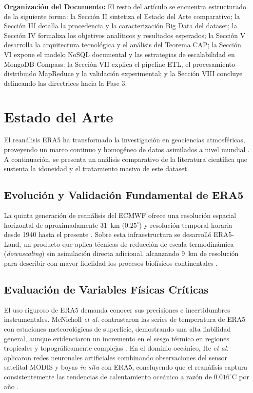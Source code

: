 \documentclass[conference]{IEEEtran}
\begin{document}
\textbf{Organización del Documento:} El resto del artículo se encuentra estructurado de la siguiente forma: la Sección II sintetiza el Estado del Arte comparativo; la Sección III detalla la procedencia y la caracterización Big Data del dataset; la Sección IV formaliza los objetivos analíticos y resultados esperados; la Sección V desarrolla la arquitectura tecnológica y el análisis del Teorema CAP; la Sección VI expone el modelo NoSQL documental y las estrategias de escalabilidad en MongoDB Compass; la Sección VII explica el pipeline ETL, el procesamiento distribuido MapReduce y la validación experimental; y la Sección VIII concluye delineando las directrices hacia la Fase 3.

\section{Estado del Arte}

El reanálisis ERA5 ha transformado la investigación en geociencias atmosféricas, proveyendo un marco continuo y homogéneo de datos asimilados a nivel mundial \cite{hersbach2020era5}. A continuación, se presenta un análisis comparativo de la literatura científica que sustenta la idoneidad y el tratamiento masivo de este dataset.

\subsection{Evolución y Validación Fundamental de ERA5}
La quinta generación de reanálisis del ECMWF ofrece una resolución espacial horizontal de aproximadamente 31~km ($0.25^\circ$) y resolución temporal horaria desde 1940 hasta el presente \cite{hersbach2020era5}. Sobre esta infraestructura se desarrolló ERA5-Land, un producto que aplica técnicas de reducción de escala termodinámica (\textit{downscaling}) sin asimilación directa adicional, alcanzando 9~km de resolución para describir con mayor fidelidad los procesos biofísicos continentales \cite{Munoz_Sabater_2021}.

\subsection{Evaluación de Variables Físicas Críticas}
El uso riguroso de ERA5 demanda conocer sus precisiones e incertidumbres instrumentales. McNicholl \textit{et al.} contrastaron las series de temperatura de ERA5 con estaciones meteorológicas de superficie, demostrando una alta fiabilidad general, aunque evidenciaron un incremento en el sesgo térmico en regiones tropicales y topográficamente complejas \cite{mcnicholl2022evaluating}. En el dominio oceánico, He \textit{et al.} aplicaron redes neuronales artificiales combinando observaciones del sensor satelital MODIS y boyas \textit{in situ} con ERA5, concluyendo que el reanálisis captura consistentemente las tendencias de calentamiento oceánico a razón de $0.016^\circ\text{C}$ por año \cite{he2023assessment}.
\end{document}
